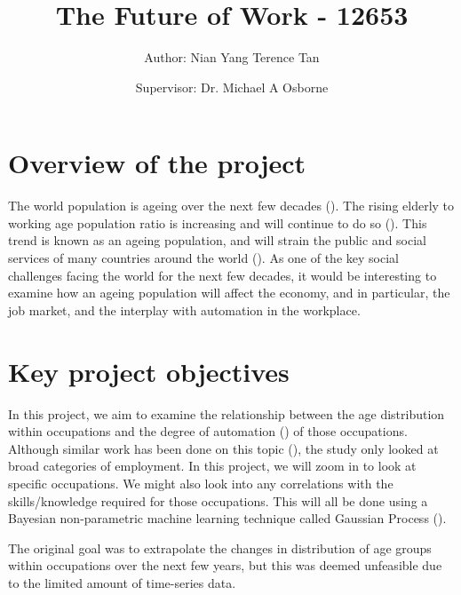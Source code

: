 \documentclass[11pt]{article}
\title{The Future of Work - 12653}
\author{Author: Nian Yang Terence Tan \and Supervisor: Dr. Michael A Osborne}
\begin{document}
\maketitle


\section{Overview of the project}
The world population is ageing over the next few decades (\cite{science}). The rising elderly to working age population ratio is increasing and will continue to do so (\cite{WHO}). This trend is known as an ageing population, and will strain the public and social services of many countries around the world (\cite{publicservicesstrain}). As one of the key social challenges facing the world for the next few decades, it would be interesting to examine how an ageing population will affect the economy, and in particular, the job market, and the interplay with automation in the workplace. 


\section{Key project objectives}
In this project, we aim to examine the relationship between the age distribution within occupations and the degree of automation (\cite{futureofemployment}) of those occupations. Although similar work has been done on this topic (\cite{twinthreats}), the study only looked at broad categories of employment. In this project, we will zoom in to look at specific occupations. We might also look into any correlations with the skills/knowledge required for those occupations. This will all be done using a Bayesian non-parametric machine learning technique called Gaussian Process (\cite{GaussianProcess}).

The original goal was to extrapolate the changes in distribution of age groups within occupations over the next few years, but this was deemed unfeasible due to the limited amount of time-series data.

  
\end{document}
